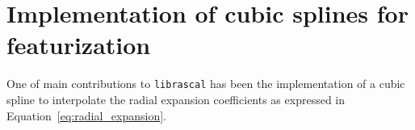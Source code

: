 \section{Implementation of cubic splines for featurization}
\label{sec:cubic_spline}
One of main contributions to \texttt{librascal} has been the implementation of a cubic spline to interpolate the radial expansion coefficients as expressed in Equation~\eqref{eq:radial_expansion}.
